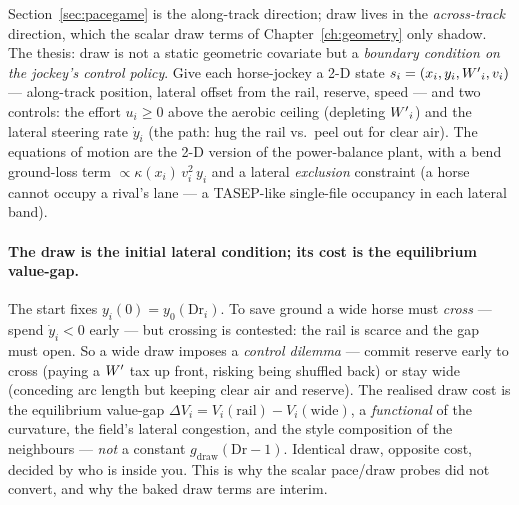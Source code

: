 Section~\ref{sec:pacegame} is the along-track direction; draw lives in the \emph{across-track}
direction, which the scalar draw terms of Chapter~\ref{ch:geometry} only shadow. The thesis: draw
is not a static geometric covariate but a \emph{boundary condition on the jockey's control policy}.
Give each horse-jockey a 2-D state $s_i = (x_i, y_i, {W^{\prime}}_i, v_i)$ --- along-track position, lateral
offset from the rail, reserve, speed --- and two controls: the effort $u_i\ge 0$ above the aerobic
ceiling (depleting ${W^{\prime}}_i$) and the lateral steering rate $\dot y_i$ (the path: hug the rail vs.\
peel out for clear air). The equations of motion are the 2-D version of the power-balance plant,
with a bend ground-loss term $\propto \kappa(x_i)\,v_i^2\,y_i$ and a lateral \emph{exclusion}
constraint (a horse cannot occupy a rival's lane --- a TASEP-like single-file occupancy in each
lateral band).

\paragraph{The draw is the initial lateral condition; its cost is the equilibrium value-gap.} The
start fixes $y_i(0)=y_0(\mathrm{Dr}_i)$. To save ground a wide horse must \emph{cross} --- spend
$\dot y_i<0$ early --- but crossing is contested: the rail is scarce and the gap must open. So a
wide draw imposes a \emph{control dilemma} --- commit reserve early to cross (paying a ${W^{\prime}}$ tax up
front, risking being shuffled back) or stay wide (conceding arc length but keeping clear air and
reserve). The realised draw cost is the equilibrium value-gap
$\Delta V_i = V_i(\text{rail}) - V_i(\text{wide})$, a \emph{functional} of the curvature, the
field's lateral congestion, and the style composition of the neighbours --- \emph{not} a constant
$g_{\text{draw}}(\mathrm{Dr}-1)$. Identical draw, opposite cost, decided by who is inside you. This
is why the scalar pace/draw probes did not convert, and why the baked draw terms are interim.

